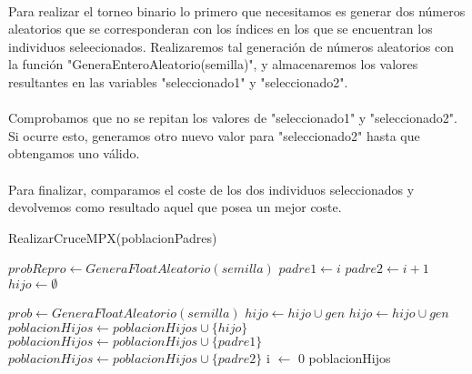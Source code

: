 	\paragraph{}Para realizar el torneo binario lo primero que necesitamos es generar dos números aleatorios que se corresponderan con los índices en los que se encuentran los individuos seleecionados. Realizaremos tal generación de números aleatorios con la función "GeneraEnteroAleatorio(semilla)", y almacenaremos los valores resultantes en las variables "seleccionado1" y "seleccionado2".
	
	\paragraph{}Comprobamos que no se repitan los valores de "seleccionado1" y "seleccionado2". Si ocurre esto, generamos otro nuevo valor para "seleccionado2" hasta que obtengamos uno válido.
	
	\paragraph{}Para finalizar, comparamos el coste de los dos individuos seleccionados y devolvemos como resultado aquel que posea un mejor coste.

	\begin{algorithm}[H]
		\caption{RealizarCruceMPX(poblacionPadres)}
		\begin{algorithmic}
				\STATE $probRepro \leftarrow GeneraFloatAleatorio(semilla)$
				\STATE $padre1 \leftarrow i$
				\STATE $padre2 \leftarrow i+1$
					\STATE $hijo \leftarrow \emptyset $
					
						\STATE $prob \leftarrow GeneraFloatAleatorio(semilla)$
							\STATE $hijo \leftarrow hijo\cup gen$
						\ENDIF
					\ENDFOR
						\STATE $hijo \leftarrow hijo\cup gen$
					\ENDFOR
					\STATE $poblacionHijos \leftarrow poblacionHijos\cup\{hijo\}$
				\ELSE
					\STATE $poblacionHijos \leftarrow poblacionHijos\cup\{padre1\}$
						\STATE $poblacionHijos \leftarrow poblacionHijos\cup\{padre2\}$
					\ENDIF
				\ENDIF
					\STATE i $\leftarrow$ 0
				\ENDIF
			\ENDFOR
			\RETURN poblacionHijos
		\end{algorithmic}
	\end{algorithm}

